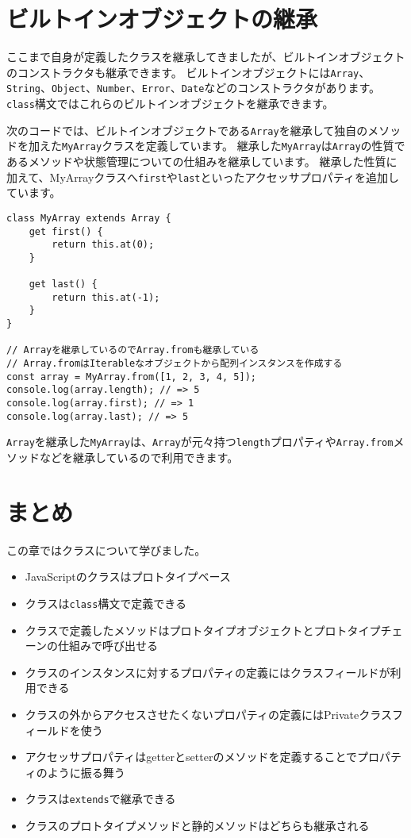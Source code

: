 \hypertarget{extends-built-in}{%
\section{ビルトインオブジェクトの継承}\label{extends-built-in}}

ここまで自身が定義したクラスを継承してきましたが、ビルトインオブジェクトのコンストラクタも継承できます。
ビルトインオブジェクトには\texttt{Array}、\texttt{String}、\texttt{Object}、\texttt{Number}、\texttt{Error}、\texttt{Date}などのコンストラクタがあります。
\texttt{class}構文ではこれらのビルトインオブジェクトを継承できます。

次のコードでは、ビルトインオブジェクトである\texttt{Array}を継承して独自のメソッドを加えた\texttt{MyArray}クラスを定義しています。
継承した\texttt{MyArray}は\texttt{Array}の性質であるメソッドや状態管理についての仕組みを継承しています。
継承した性質に加えて、MyArrayクラスへ\texttt{first}や\texttt{last}といったアクセッサプロパティを追加しています。

\enlargethispage{\baselineskip}\begin{lstlisting}
class MyArray extends Array {
    get first() {
        return this.at(0);
    }

    get last() {
        return this.at(-1);
    }
}

// Arrayを継承しているのでArray.fromも継承している
// Array.fromはIterableなオブジェクトから配列インスタンスを作成する
const array = MyArray.from([1, 2, 3, 4, 5]);
console.log(array.length); // => 5
console.log(array.first); // => 1
console.log(array.last); // => 5
\end{lstlisting}

\texttt{Array}を継承した\texttt{MyArray}は、\texttt{Array}が元々持つ\texttt{length}プロパティや\texttt{Array.from}メソッドなどを継承しているので利用できます。

\hypertarget{conclusion}{%
\section{まとめ}\label{conclusion}}

この章ではクラスについて学びました。

\begin{itemize}
\item
  JavaScriptのクラスはプロトタイプベース
\item
  クラスは\texttt{class}構文で定義できる
\item
  クラスで定義したメソッドはプロトタイプオブジェクトとプロトタイプチェーンの仕組みで呼び出せる
\item
  クラスのインスタンスに対するプロパティの定義にはクラスフィールドが利用できる
\item
 クラスの外からアクセスさせたくないプロパティの定義にはPrivateクラスフィールドを使う
\item
  アクセッサプロパティはgetterとsetterのメソッドを定義することでプロパティのように振る舞う
\item
  クラスは\texttt{extends}で継承できる
\item
  クラスのプロトタイプメソッドと静的メソッドはどちらも継承される
\end{itemize}
